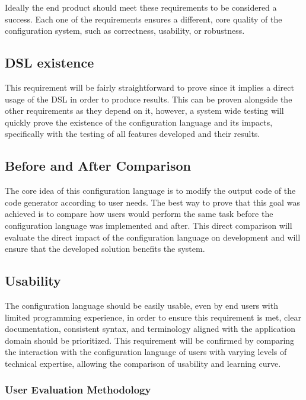 Ideally the end product should meet these requirements to be considered a success. Each one of the requirements ensures a different, core quality of the configuration system, such as correctness, usability, or robustness.

\subsection*{DSL existence}

This requirement will be fairly straightforward to prove since it implies a direct usage of the \gls{DSL} in order to produce results. This can be proven alongside the other requirements as they depend on it, however, a system wide testing will quickly prove the existence of the configuration language and its impacts, specifically with the testing of all features developed and their results.

\subsection*{Before and After Comparison}

The core idea of this configuration language is to modify the output code of the code generator according to user needs. The best way to prove that this goal was achieved is to compare how users would perform the same task before the configuration language was implemented and after. This direct comparison will evaluate the direct impact of the configuration language on development and will ensure that the developed solution benefits the system. 

\subsection*{Usability}

The configuration language should be easily usable, even by end users with limited programming experience, in order to ensure this requirement is met, clear documentation, consistent syntax, and terminology aligned with the application domain should be prioritized. This requirement will be confirmed by comparing the interaction with the configuration language of users with varying levels of technical expertise, allowing the comparison of usability and learning curve.

\subsubsection*{User Evaluation Methodology}

